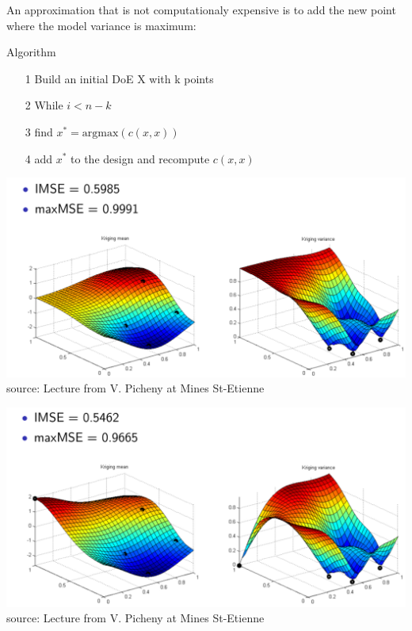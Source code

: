 \documentclass{beamer}
\begin{document}
\begin{frame}{}
An approximation that is not computationaly expensive is to add the new point where the model variance is maximum:
\begin{block}{Algorithm}
	\begin{itemize}
		\item[1] Build an initial DoE X with k points
		\item[2] While $i < n-k$
		\item[3] \qquad find $x^* = \mathrm{argmax}(c(x,x))$
		\item[4] \qquad add  $x^*$ to the design and recompute $c(x,x)$
	\end{itemize}
\end{block}
\end{frame}

\begin{frame}{}
\vspace{5mm}
\includegraphics[width=\textwidth]{figures/adaptative1}\\
\vfill
source: Lecture from V. Picheny at Mines St-Etienne
\end{frame}

\begin{frame}{}
\vspace{5mm}
\includegraphics[width=\textwidth]{figures/adaptative2}\\
\vfill
source: Lecture from V. Picheny at Mines St-Etienne
\end{frame}
\end{document}
